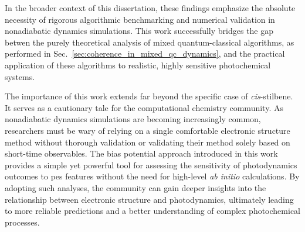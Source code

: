 In the broader context of this dissertation, these findings emphasize the absolute necessity of rigorous algorithmic benchmarking and numerical validation in nonadiabatic dynamics simulations. This work successfully bridges the gap betwen the purely theoretical analysis of mixed quantum-classical algorithms, as performed in Sec.~\ref{sec:coherence_in_mixed_qc_dynamics}, and the practical application of these algorithms to realistic, highly sensitive photochemical systems.

The importance of this work extends far beyond the specific case of \textit{cis}-stilbene. It serves as a cautionary tale for the computational chemistry community. As nonadiabatic dynamics simulations are becoming increasingly common, researchers must be wary of relying on a single comfortable electronic structure method without thorough validation or validating their method solely based on short-time observables. The bias potential approach introduced in this work provides a simple yet powerful tool for assessing the sensitivity of photodynamics outcomes to \acrshort{pes} features without the need for high-level \textit{ab initio} calculations. By adopting such analyses, the community can gain deeper insights into the relationship between electronic structure and photodynamics, ultimately leading to more reliable predictions and a better understanding of complex photochemical processes.
